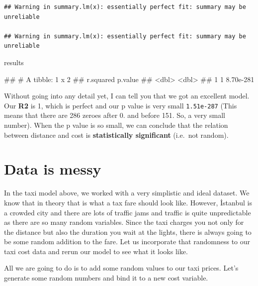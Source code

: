 \documentclass[
]{book}
\newenvironment{Shaded}{\begin{snugshade}}{\end{snugshade}}
\newcommand{\NormalTok}[1]{#1}
\begin{document}
\begin{verbatim}
## Warning in summary.lm(x): essentially perfect fit: summary may be unreliable

## Warning in summary.lm(x): essentially perfect fit: summary may be unreliable
\end{verbatim}

\begin{Shaded}
\begin{Highlighting}[]
\NormalTok{results}
\end{Highlighting}
\end{Shaded}

\begin{Shaded}
\begin{Highlighting}[]
\NormalTok{\#\# \# A tibble: 1 x 2}
\NormalTok{\#\#   r.squared   p.value}
\NormalTok{\#\#       \textless{}dbl\textgreater{}     \textless{}dbl\textgreater{}}
\NormalTok{\#\# 1         1 8.70e{-}281}
\end{Highlighting}
\end{Shaded}

Without going into any detail yet, I can tell you that we got an excellent model. Our \textbf{R2} is 1, which is perfect and our p value is very small \texttt{1.51e-287} (This means that there are 286 zeroes after 0. and before 151. So, a very small number). When the p value is so small, we can conclude that the relation between distance and cost is \textbf{statistically significant} (i.e.~not random).

\hypertarget{data-is-messy}{%
\section{Data is messy}\label{data-is-messy}}

In the taxi model above, we worked with a very simplistic and ideal dataset. We know that in theory that is what a tax fare should look like. However, İstanbul is a crowded city and there are lots of traffic jams and traffic is quite unpredictable as there are so many random variables. Since the taxi charges you not only for the distance but also the duration you wait at the lights, there is always going to be some random addition to the fare. Let us incorporate that randomness to our taxi cost data and rerun our model to see what it looks like.

All we are going to do is to add some random values to our taxi prices. Let's generate some random numbers and bind it to a new cost variable.
\end{document}
